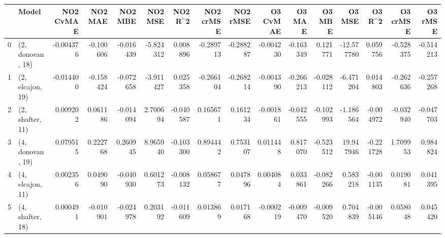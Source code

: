 \begin{tabular}{llrrrrrrrrrrrrrr}
\toprule
{} &             Model &  NO2 CvMAE &   NO2 MAE &   NO2 MBE &   NO2 MSE &   NO2 R\textasciicircum2 &  NO2 crMSE &  NO2 rMSE &  O3 CvMAE &    O3 MAE &    O3 MBE &     O3 MSE &    O3 R\textasciicircum2 &  O3 crMSE &   O3 rMSE \\
\midrule
0 &  (2, donovan, 18) &  -0.004376 & -0.100606 & -0.016439 & -5.824312 &  0.008896 &  -0.289713 & -0.288287 & -0.004230 & -0.163349 &  0.121771 & -12.577780 &  0.059756 & -0.528375 & -0.514213 \\
1 &  (2, elcajon, 19) &  -0.014400 & -0.158424 & -0.072658 & -3.911427 &  0.025358 &  -0.266104 & -0.268214 & -0.004390 & -0.266213 & -0.028112 &  -6.471204 &  0.014803 & -0.262636 & -0.257268 \\
2 &  (2, shafter, 11) &   0.009202 &  0.061186 & -0.014094 &  2.700694 & -0.040587 &   0.165671 &  0.161234 & -0.001861 & -0.042555 & -0.102993 &  -1.186564 & -0.004972 & -0.032940 & -0.047703 \\
3 &  (4, donovan, 19) &   0.079515 &  0.222768 &  0.260945 &  8.965940 & -0.103300 &   0.894442 &  0.753107 &  0.011448 &  0.817070 & -0.523512 &  19.947946 & -0.221728 &  1.709953 &  0.984824 \\
4 &  (4, elcajon, 11) &   0.002356 &  0.049090 & -0.040930 &  0.601273 & -0.008132 &   0.058677 &  0.047896 &  0.004084 &  0.033861 & -0.082266 &   0.583218 & -0.001135 &  0.019081 &  0.041395 \\
5 &  (4, shafter, 18) &   0.000491 & -0.010901 & -0.024978 &  0.203192 & -0.011609 &   0.013869 &  0.017168 & -0.000219 & -0.009470 & -0.009520 &   0.704839 & -0.005146 &  0.058048 &  0.045420 \\
\bottomrule
\end{tabular}
